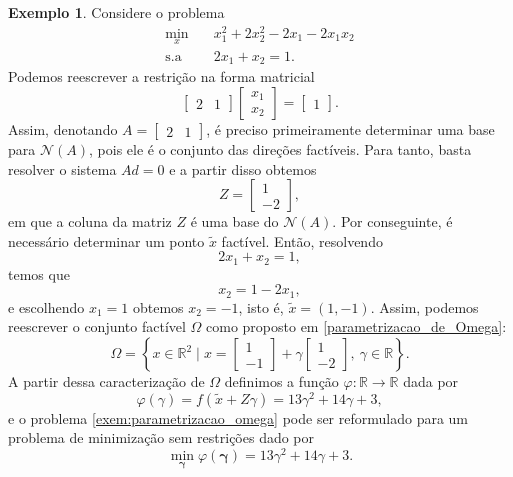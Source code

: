 \documentclass[12pt,a4paper]{scrartcl}
\def\RR{\mathds{R}}
\theoremstyle{definition}%
\newtheorem{exem}{Exemplo}
\begin{document}
\begin{exem}
Considere o problema 
\[ \label{exem:parametrizacao_omega}
\begin{aligned}
\min_{x} & \quad x_{1}^{2} + 2x_{2}^{2} - 2x_{1} - 2x_{1}x_{2} \\
\text{s.a} & \quad 2x_{1} + x_{2} = 1 .
\end{aligned}
\]
Podemos reescrever a restrição na forma matricial
\[
\begin{bmatrix*} 2 & 1 \end{bmatrix*} \begin{bmatrix*} x_{1} \\ x_{2} \end{bmatrix*} = \begin{bmatrix*} 1 \end{bmatrix*} .
\]
Assim, denotando $A= \begin{bmatrix*} 2 & 1 \end{bmatrix*}$, é preciso primeiramente determinar uma base para $\mathcal{N}(A)$, pois ele é o conjunto das direções factíveis. Para tanto, basta resolver o sistema $Ad =0$ e a partir disso obtemos 
\[ \label{eq:1_exem_parametrizacao_omega}
Z = \begin{bmatrix*} 1 \\ -2 \end{bmatrix*} ,
\]
em que a coluna da matriz $Z$ é uma base do $\mathcal{N}(A)$. Por conseguinte, é necessário determinar um ponto $\tilde{x}$ factível. Então, resolvendo
\[
2x_{1} + x_{2} = 1 ,
\]
temos que 
\[
x_{2} = 1 - 2x_{1} ,
\]
e escolhendo $x_{1} =1$ obtemos $x_{2} = -1$, isto é, $\tilde{x} = (1,-1)$. Assim, podemos reescrever o conjunto factível $\Omega$ como proposto em \eqref{parametrizacao_de_Omega}:
\[
\Omega = \left\{ x\in \RR^{2} \mid x = \begin{bmatrix*} 1 \\ -1 \end{bmatrix*} + \gamma \begin{bmatrix*} 1 \\ -2 \end{bmatrix*} , \ \gamma \in \RR \right\} .
\]
A partir dessa caracterização de $\Omega$ definimos a função $\varphi : \RR \rightarrow \RR$ dada por 
\[
\varphi(\gamma) = f(\tilde{x} + Z\gamma) = 13\gamma^{2} + 14\gamma +3 ,
\]
e o problema \eqref{exem:parametrizacao_omega} pode ser reformulado para um problema de minimização sem restrições dado por
\[ \label{exem:parametrizacao_omega_funcao_phi}
\min_{\boldsymbol{\gamma}} \varphi (\boldsymbol{\gamma}) = 13\gamma^{2} + 14\gamma +3 .
\]
\end{exem}
\end{document}
